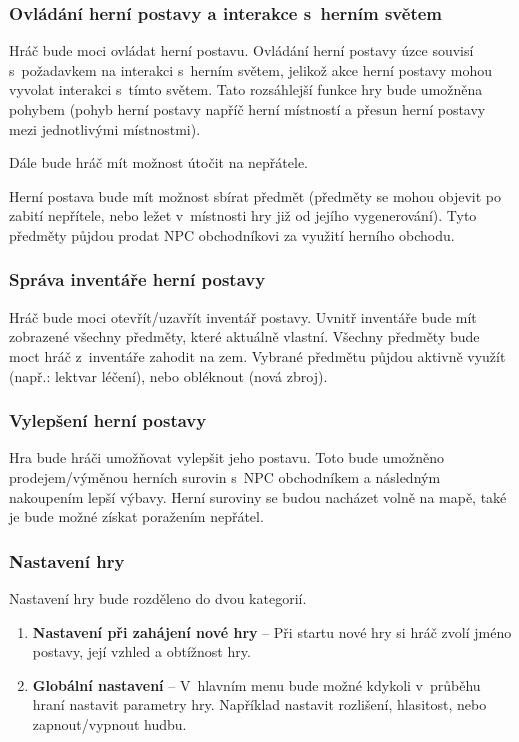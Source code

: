 \documentclass[12pt,a4paper]{article}
\begin{document}
\subsubsection{Ovládání herní postavy a interakce s~herním světem}
Hráč bude moci ovládat herní postavu. Ovládání herní postavy úzce souvisí
s~požadavkem na interakci s~herním světem, jelikož akce herní postavy mohou vyvolat
interakci s~tímto světem. Tato rozsáhlejší funkce hry bude umožněna pohybem
(pohyb herní postavy napříč herní místností a přesun herní postavy mezi
jednotlivými místnostmi).

Dále bude hráč mít možnost útočit na nepřátele.

Herní postava bude mít možnost sbírat předmět (předměty se mohou objevit po
zabití nepřítele, nebo ležet v~místnosti hry již od jejího vygenerování). Tyto
předměty půjdou prodat NPC obchodníkovi za využití herního obchodu.

\subsubsection{Správa inventáře herní postavy}
Hráč bude moci otevřít/uzavřít inventář postavy. Uvnitř inventáře bude mít
zobrazené všechny předměty, které aktuálně vlastní. Všechny předměty bude moct
hráč z~inventáře zahodit na zem. Vybrané předmětu půjdou aktivně využít (např.:
lektvar léčení), nebo obléknout (nová zbroj).

\subsubsection{Vylepšení herní postavy}
Hra bude hráči umožňovat vylepšit jeho postavu. Toto bude umožněno
prodejem/výměnou herních surovin s~NPC obchodníkem a následným nakoupením lepší
výbavy.  Herní suroviny se budou nacházet volně na mapě, také je bude možné
získat poražením nepřátel.

\subsubsection{Nastavení hry}
Nastavení hry bude rozděleno do dvou kategorií.

\begin{enumerate}
  \item{\textbf{Nastavení při zahájení nové hry} -- Při startu nové hry si hráč
    zvolí jméno postavy, její vzhled a obtížnost hry.}
  \item{\textbf{Globální nastavení} -- V~hlavním menu bude možné kdykoli
v~průběhu hraní nastavit parametry hry. Například nastavit rozlišení,
    hlasitost, nebo zapnout/vypnout hudbu.}
\end{enumerate}
\end{document}
